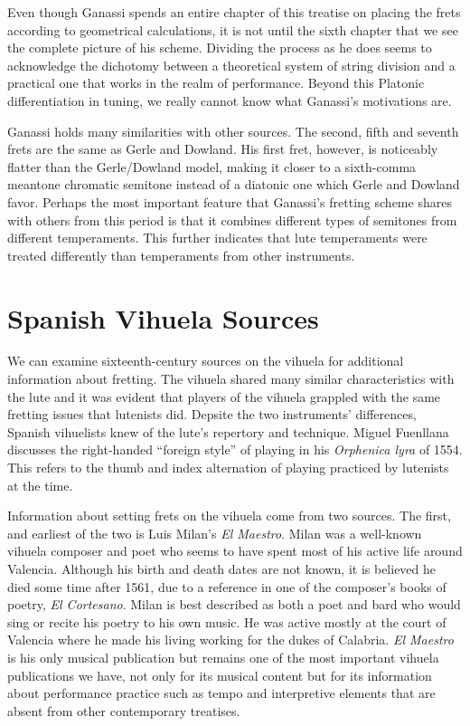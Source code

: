 Even though Ganassi spends an entire chapter of this treatise on placing the frets
according to geometrical calculations, it is not until the sixth chapter that we see
the complete picture of his scheme.  Dividing the process as he does seems to
acknowledge the dichotomy between a theoretical system of string division and a
practical one that works in the realm of performance.  Beyond this Platonic
differentiation in tuning, we really cannot know what Ganassi's motivations are.

Ganassi holds many similarities with other sources.  The second, fifth and seventh
frets are the same as Gerle and Dowland.  His first fret, however, is noticeably
flatter than the Gerle/Dowland model, making it closer to a sixth-comma meantone
chromatic semitone instead of a diatonic one which Gerle and Dowland favor. Perhaps the
most important feature that Ganassi's fretting scheme shares with others from this
period is that it combines different types of semitones from different temperaments.  This
further indicates that lute temperaments were treated differently than temperaments from
other instruments.

\section{Spanish Vihuela Sources}

We can examine sixteenth-century sources on the vihuela for additional information about fretting.
The vihuela shared many similar characteristics with the lute and it was evident that players of the
vihuela grappled with the same fretting issues that lutenists did.  Depsite the two instruments'
differences, Spanish vihuelists knew of the lute's repertory and technique.  Miguel Fuenllana
discusses the right-handed ``foreign style'' of playing in his \textit{Orphenica lyra} of
1554.  This refers to the thumb and index alternation of playing practiced by lutenists at the time.

Information about setting frets on the vihuela come from two sources. The first, and
earliest of the two is Luis Milan's \textit{El Maestro}.  Milan was a well-known vihuela
composer and poet who seems to have spent most of his active life around Valencia.
Although his birth and death dates are not known, it is believed he died some time
after 1561, due to a reference in one of the composer's books of poetry, \textit{El
Cortesano}.\autocite[6]{LG:1}  Milan is best described as both a poet and bard who
would sing or recite his poetry to his own music.  He was active mostly at the court of
Valencia where he made his living working for the dukes of Calabria. \textit{El
Maestro} is his only musical publication but remains one of the most important vihuela
publications we have, not only for its musical content but for its information about
performance practice such as tempo and interpretive elements that are absent from
other contemporary treatises.

